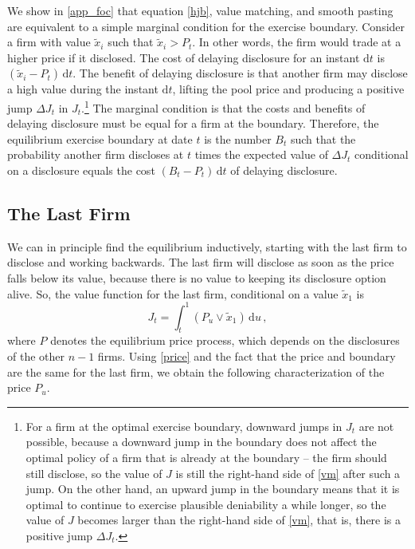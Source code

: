 \documentclass[authoryear,letterpaper,english,12pt]{elsarticle}
\theoremstyle{plain}
\numberwithin{lemma}{section}
\numberwithin{proposition}{section}
\numberwithin{equation}{section}
\numberwithin{figure}{section}
\newcommand{\D}{\mathrm{d}}
\begin{document}
We show in \ref{app_foc} that equation \eqref{hjb}, value matching, and smooth pasting are equivalent to a simple marginal condition for the exercise boundary.  Consider a firm with value $\tilde x_i$ such that $\tilde x_i > P_t$.  In other words, the firm would trade at a higher price if it disclosed.  The cost of delaying disclosure for an instant $\D t$ is $(\tilde x_i -P_t)\,\D t$.  The benefit of delaying disclosure is that another firm may disclose a high value during the instant $\D t$, lifting the pool price and producing a positive jump $\Delta J_t$ in $J_t$.\footnote{For a firm at the optimal exercise boundary, downward jumps in $J_t$ are not possible, because a  downward jump in the boundary does not affect the optimal policy of a firm that is already at the boundary -- the firm should still disclose, so the value of $J$ is still the right-hand side of \eqref{vm} after such a jump.  On the other hand, an upward jump in the boundary means that it is optimal to continue to exercise plausible deniability a while longer, so the value of $J$ becomes larger than the right-hand side of \eqref{vm}, that is, there is a positive jump $\Delta J_t$.}    The marginal condition is that the costs and benefits of delaying disclosure must be equal for a firm at the boundary.  Therefore, the equilibrium exercise boundary at date $t$ is the number $B_t$ such that the probability another firm discloses at $t$ times the expected value of $\Delta J_t$ conditional on a disclosure equals the cost $(B_t-P_t)\,\D t$ of delaying disclosure.  

\subsection{The Last Firm}

We can in principle find the equilibrium inductively, starting with the last firm to disclose and working backwards.  The last firm will disclose as soon as the price falls below its value, because there is no value to keeping its disclosure option alive.  So, the value function for the last firm, conditional on a value $\tilde x_1$ is
\begin{equation}\label{value:last}
    J_t = \int_t^1 (P_u \vee \tilde x_1)\,\D u\,,
\end{equation}
where $P$ denotes the equilibrium price process, which depends on the disclosures of the other $n-1$ firms.  Using \eqref{price} and the fact that the price and boundary are the same for the last firm, we obtain the following characterization of the price $P_u$.  
\end{document}
